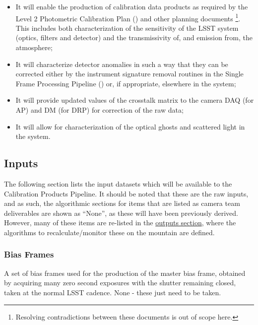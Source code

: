 \begin{itemize}
 \item It will enable the production of calibration data products as required by the Level 2 Photometric Calibration Plan (\NewPCP{}) and other planning documents \cite{Lupton15}\footnote{Resolving contradictions between these documents is out of scope here.}. This includes both characterization of the sensitivity of the LSST system (optics, filters and detector) and the transmissivity of, and emission from, the atmosphere;
 
 \item It will characterize detector anomalies in such a way that they can be corrected either by the instrument signature removal routines in the Single Frame Processing Pipeline (\wbsSFM) or, if appropriate, elsewhere in the system;
 
 \item It will provide updated values of the crosstalk matrix to the camera DAQ (for AP) and DM (for DRP) for correction of the raw data;
 
 \item It will allow for characterization of the optical ghosts and scattered light in the system.
\end{itemize}



\subsection{Inputs}
\label{sec:CPP:inputs} 
The following section lists the input datasets which will be available to the Calibration Products Pipeline. It should be noted that these are the raw inputs, and as such, the algorithmic sections for items that are listed as camera team deliverables are shown as ``None'', as these will have been previously derived. However, many of these items are re-listed in the \hyperref[sec:CPP:output]{outputs section}, where the algorithms to recalculate/monitor these on the mountain are defined.

\subsubsection{Bias Frames}\label{sec:CPP:inputs:biases} 
A set of bias frames used for the production of the master bias frame, obtained by acquiring many zero second exposures with the shutter remaining closed, taken at the normal LSST cadence.
\alg None - these just need to be taken.


